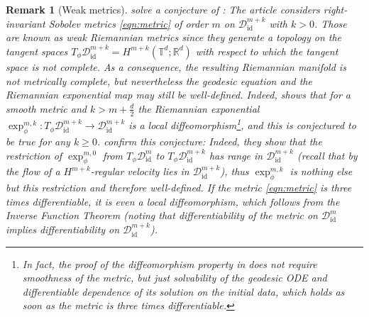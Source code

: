 \documentclass[a4paper, 12pt]{article}
\newtheorem{remark}[theorem]{Remark}
\newcommand{\R}{\mathbb{R}}
\newcommand{\T}{\mathbb{T}}
\newcommand{\id}{\mathrm{id}}
\newcommand{\DiffSobId}{\mathcal D_{\id}}
\begin{document}
\begin{remark}[Weak metrics]\label{rem:weakMetrics}
 solve a conjecture of \cite{MiPr10}:
The article considers right-invariant Sobolev metrics \eqref{eqn:metric} of order $m$ on $\DiffSobId^{m+k}$ with $k>0$.
Those are known as weak Riemannian metrics since they generate a topology on the tangent spaces $T_\phi\DiffSobId^{m+k}=H^{m+k}(\T^d;\R^d)$
with respect to which the tangent space is not complete.
As a consequence, the resulting Riemannian manifold is not metrically complete,
but nevertheless the geodesic equation and the Riemannian exponential map may still be well-defined.
Indeed, \cite[Thm.\,4.1]{MiPr10} shows that for a smooth metric and $k>m+\frac d2$ the Riemannian exponential $\exp_\phi^{m,k}:T_\phi\DiffSobId^{m+k}\to\DiffSobId^{m+k}$ is a local diffeomorphism\footnote{In fact, the proof of the diffeomorphism property in \cite[Thm.\,4.1]{MiPr10} does not require smoothness of the metric,
but just solvability of the geodesic ODE and differentiable dependence of its solution on the initial data, which holds as soon as the metric is three times differentiable.},
and this is conjectured to be true for any $k\geq0$.
 confirm this conjecture:
Indeed, they show that the restriction of $\exp_\phi^{m,0}$ from $T_\phi\DiffSobId^m$ to $T_\phi\DiffSobId^{m+k}$ has range in $\DiffSobId^{m+k}$
(recall that by \cite{BrVi17} the flow of a $H^{m+k}$-regular velocity lies in $\DiffSobId^{m+k}$),
thus $\exp_\phi^{m,k}$ is nothing else but this restriction and therefore well-defined.
If the metric \eqref{eqn:metric} is three times differentiable, it is even a local diffeomorphism,
which follows from the Inverse Function Theorem (noting that differentiability of the metric on $\DiffSobId^m$ implies differentiability on $\DiffSobId^{m+k}$).
\end{remark}
\end{document}
